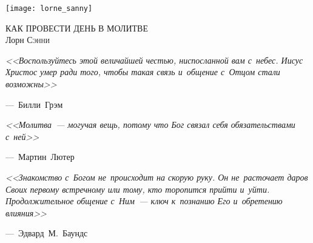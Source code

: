 \documentclass[12pt,article,a4paper,fittopage]{ncc}
\begin{document}
\begin{center}
\texttt{[image: lorne\_sanny]}

\thispagestyle{empty}

\vspace{0.5cm}
\textsc{\LARGE{КАК ПРОВЕСТИ ДЕНЬ В МОЛИТВЕ}}\\[0.3cm]
Лорн \textsc{Сэнни}
\end{center}

\begin{flushright}
\textit{<<Воспользуйтесь этой величайшей честью, ниспосланной вам с~небес. Иисус Христос умер ради того, чтобы такая связь и~общение с~Отцом стали возможны>>}
\par
---~Билли~Грэм
\end{flushright}

\begin{flushright}
\textit{<<Молитва~--- могучая вещь, потому что Бог связал себя обязательствами с~ней>>}
\par
---~Мартин~Лютер
\end{flushright}

\begin{flushright}
\textit{<<Знакомство с~Богом не~происходит на скорую руку. Он не~расточает даров Своих первому встречному или тому, кто торопится прийти и~уйти. Продолжительное общение с~Ним~--- ключ к~познанию Его и~обретению влияния>>}	
\par
---~Эдвард~М.~Баундс
\end{flushright}
\end{document}

